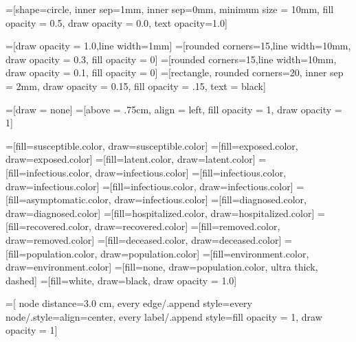 \usepackage{standalone}
\usepackage[utf8]{inputenc}
\usepackage{latexsym}
\usepackage{xcolor}
\usepackage{transparent}
\usepackage{tikz}
\usepackage{pgfplots}
\usetikzlibrary{arrows.meta,positioning}
\usetikzlibrary{arrows,snakes,backgrounds}
\usetikzlibrary{fit,shapes.geometric}



=[shape=circle, 
    inner sep=1mm, inner sep=0mm, minimum size = 10mm, 
    fill opacity = 0.5, draw opacity = 0.0, text opacity=1.0]

=[draw opacity = 1.0,line width=1mm]
=[rounded corners=15,line width=10mm,
        draw opacity = 0.3, fill opacity = 0]
=[rounded corners=15,line width=10mm,
        draw opacity = 0.1, fill opacity = 0]
=[rectangle, rounded corners=20, inner sep = 2mm,
        draw opacity = 0.15, fill opacity = .15, text = black]
        
        
        
=[draw = none]
=[above = .75cm, align = left, fill opacity = 1, draw opacity = 1]

=[fill=susceptible.color, draw=susceptible.color]
=[fill=exposed.color, draw=exposed.color]
=[fill=latent.color, draw=latent.color]
=[fill=infectious.color, draw=infectious.color]
=[fill=infectious.color, draw=infectious.color]
=[fill=infectious.color, draw=infectious.color]
=[fill=asymptomatic.color, draw=infectious.color]
=[fill=diagnosed.color, draw=diagnosed.color]
=[fill=hospitalized.color, draw=hospitalized.color]
=[fill=recovered.color, draw=recovered.color]
=[fill=removed.color, draw=removed.color]
=[fill=deceased.color, draw=deceased.color]
=[fill=population.color, draw=population.color]
=[fill=environment.color, draw=environment.color]
=[fill=none, draw=population.color, ultra thick, dashed]
=[fill=white, draw=black, draw opacity = 1.0]

=[
    node distance=3.0 cm, 
    every edge/.append style={every node/.style={align=center}},
    every label/.append style={fill opacity = 1, draw opacity = 1}]
    
\newcommand{\testgroup}[3]{
    \node[nodegroup, #1, #2, label={[#3.color]alsdjfg}] (foo) {};
}

